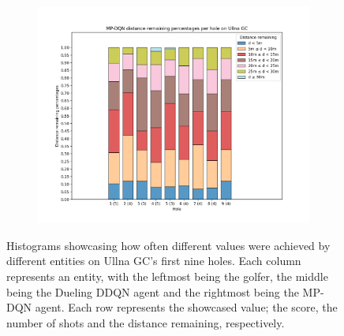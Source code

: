 \documentclass{kththesis}
\begin{document}
\begin{figure}
{\begin{subfigure}{0.3\paperwidth}
    \includegraphics[width=0.3\paperwidth]{AgentPercentages/MPDQN_Distance_Percentages_Ullna.png} 
    \end{subfigure}
    }
    \caption{Histograms showcasing how often different values were achieved by different entities on Ullna GC's first nine holes. Each column represents an entity, with the leftmost being the golfer, the middle being the Dueling DDQN agent and the rightmost being the MP-DQN agent. Each row represents the showcased value; the score, the number of shots and the distance remaining, respectively.}
    \label{fig:ullna_histograms}
\end{figure}
\end{document}
